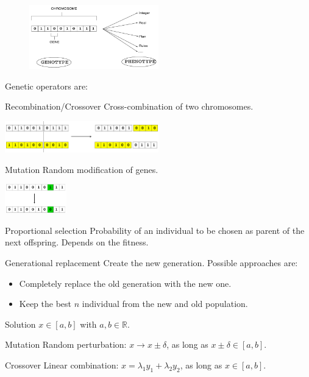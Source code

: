 \begin{figure}[H]
    \centering
    \includegraphics[width=0.5\textwidth]{img/_genetic_terminology.pdf}
    \caption{}
\end{figure}


Genetic operators are:
\begin{descriptionlist}
    \item[Recombination/Crossover] 
        Cross-combination of two chromosomes.
        \begin{center}
            \includegraphics[width=0.5\textwidth]{img/_genetic_crossover.pdf}
        \end{center}
    \item[Mutation] 
        Random modification of genes.
        \begin{center}
            \includegraphics[width=0.2\textwidth]{img/_genetic_mutation.pdf}
        \end{center}
    \item[Proportional selection] 
        Probability of an individual to be chosen as parent of the next offspring. 
        Depends on the fitness.
    \item[Generational replacement] 
        Create the new generation. Possible approaches are:
        \begin{itemize}
            \item Completely replace the old generation with the new one.
            \item Keep the best $n$ individual from the new and old population.
        \end{itemize}
\end{descriptionlist}

\begin{example}
    Solution $x \in [a, b]$ with $a, b \in \mathbb{R}$.
    \begin{descriptionlist}
        \item[Mutation] Random perturbation: $x \rightarrow x \pm \delta$, as long as $x \pm \delta \in [a, b]$.
        \item[Crossover] Linear combination: $x = \lambda_1 y_1 + \lambda_2 y_2$, as long as $x \in [a, b]$.
    \end{descriptionlist}
\end{example}


